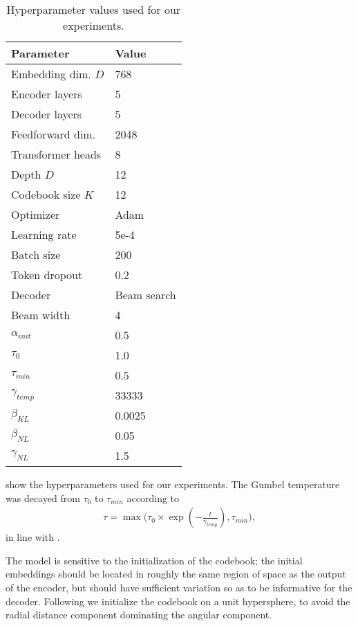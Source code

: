\documentclass[11pt]{article}
\begin{document}
\begin{table}[ht]
    \centering
\begin{tabular}{l|p{4cm}}
    \textbf{Parameter} & \textbf{Value} \\
    \hline
    Embedding dim. $D$ & 768 \\
    Encoder layers & 5 \\
    Decoder layers & 5 \\
    Feedforward dim. & 2048 \\
    Transformer heads & 8 \\
    Depth $D$& 12 \\
    Codebook size $K$& 12 \\
    Optimizer & Adam~\cite{adam} \\
    Learning rate & 5e-4 \\
    Batch size & 200 \\
    Token dropout & 0.2~\cite{tokendropout} \\
    Decoder & Beam search \\
    Beam width & 4 \\
    $\alpha_{init}$ & 0.5 \\
    $\tau_0$ & 1.0 \\
    $\tau_{min}$ & 0.5 \\
    $\gamma_{temp}$ & 33333 \\
    $\beta_{KL}$ & 0.0025 \\
    $\beta_{NL}$ & 0.05 \\
    $\gamma_{NL}$ & 1.5 \\
    \end{tabular}
    \caption{Hyperparameter values used for our experiments.}
    \label{tab:hyperparams}
\end{table}

 show the hyperparameters used for our experiments. The Gumbel temperature was decayed from $\tau_0$ to $\tau_{min}$ according to 
\begin{multline}
    \tau = \max \big(\tau_0 \times \exp(-\frac{t}{\gamma_{temp}}), \tau_{min} \big ),
\end{multline}
in line with \citet{jang2016categorical}.

The model is sensitive to the initialization of the codebook; the initial embeddings should be located in roughly the same region of space as the output of the encoder, but should have sufficient variation so as to be informative for the decoder. Following \citet{9207145} we initialize the codebook on a unit hypersphere, to avoid the radial distance component dominating the angular component.
\end{document}
